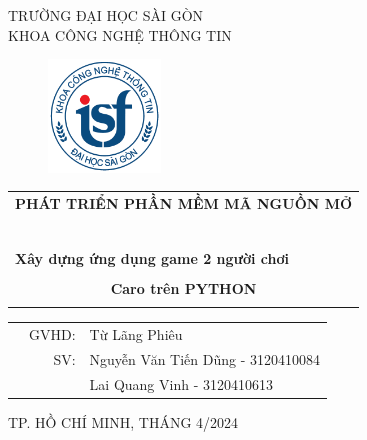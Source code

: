 \documentclass[a4paper]{article}
\begin{document}
\begin{titlepage}
\begin{center}
TRƯỜNG ĐẠI HỌC SÀI GÒN \\
KHOA CÔNG NGHỆ THÔNG TIN
\end{center}
\vspace{1cm}

\begin{figure}[h!]
\begin{center}
\includegraphics[width=3cm]{images/logoITSGU.png}
\end{center}
\end{figure}

\vspace{1cm}


\begin{center}
\begin{tabular}{c}
	\multicolumn{1}{l}{\textbf{{\Large PHÁT TRIỂN PHẦN MỀM MÃ NGUỒN MỞ}}}\\
	~~\\
	\hline
	\\
	\multicolumn{1}{l}{\textbf{{\Large Xây dựng ứng dụng game 2 người chơi}}}\\
	\\
	
	\textbf{{\Huge Caro trên PYTHON}}\\
	\\
	\hline
\end{tabular}
\end{center}

\vspace{3cm}

\begin{table}[h]
\begin{tabular}{rrl}
\hspace{5 cm} & GVHD: &Từ Lãng Phiêu\\
& SV: & Nguyễn Văn Tiến Dũng - 3120410084\\
& & Lai Quang Vinh - 3120410613 \\

\end{tabular}
\vspace{1.5 cm}
\end{table}

\begin{center}

{\footnotesize TP. HỒ CHÍ MINH, THÁNG 4/2024}
\end{center}
\end{titlepage}
\end{document}
